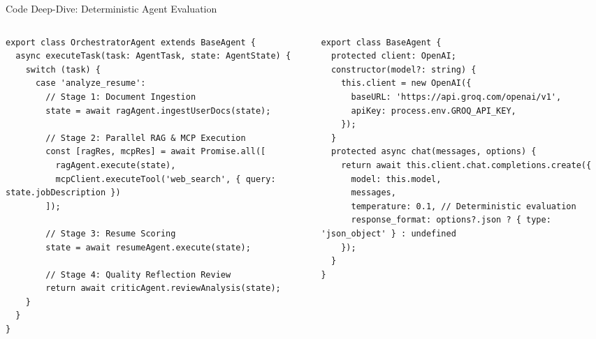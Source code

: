 \documentclass[aspectratio=169, 10pt]{beamer}
\begin{document}
\begin{frame}[fragile]{Code Deep-Dive: Deterministic Agent Evaluation}
  \begin{columns}
    \begin{column}{0.5\textwidth}
\begin{lstlisting}[caption={Orchestrator Agent Parallel Pipeline}]
export class OrchestratorAgent extends BaseAgent {
  async executeTask(task: AgentTask, state: AgentState) {
    switch (task) {
      case 'analyze_resume':
        // Stage 1: Document Ingestion
        state = await ragAgent.ingestUserDocs(state);
        
        // Stage 2: Parallel RAG & MCP Execution
        const [ragRes, mcpRes] = await Promise.all([
          ragAgent.execute(state),
          mcpClient.executeTool('web_search', { query: state.jobDescription })
        ]);
        
        // Stage 3: Resume Scoring
        state = await resumeAgent.execute(state);
        
        // Stage 4: Quality Reflection Review
        return await criticAgent.reviewAnalysis(state);
    }
  }
}
\end{lstlisting}
    \end{column}

    \begin{column}{0.5\textwidth}
\begin{lstlisting}[caption={Deterministic Interview Scoring (temp=0.1)}]
export class BaseAgent {
  protected client: OpenAI;
  constructor(model?: string) {
    this.client = new OpenAI({
      baseURL: 'https://api.groq.com/openai/v1',
      apiKey: process.env.GROQ_API_KEY,
    });
  }
  protected async chat(messages, options) {
    return await this.client.chat.completions.create({
      model: this.model,
      messages,
      temperature: 0.1, // Deterministic evaluation
      response_format: options?.json ? { type: 'json_object' } : undefined
    });
  }
}
\end{lstlisting}
    \end{column}
  \end{columns}
\end{frame}
\end{document}
